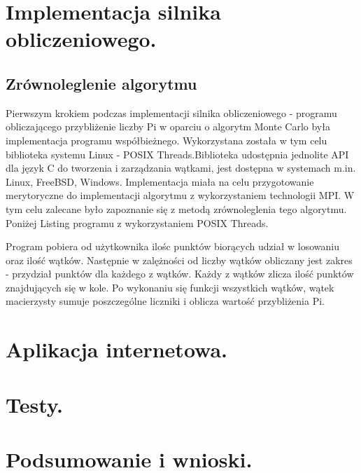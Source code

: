 \documentclass[a4paper,12pt]{article}		%
\begin{document}
\section{Implementacja silnika obliczeniowego.}

\subsection{Zrównoleglenie algorytmu}
Pierwszym krokiem podczas implementacji silnika obliczeniowego - programu obliczającego przybliżenie liczby Pi w oparciu o algorytm Monte Carlo była implementacja programu współbieżnego. Wykorzystana została w tym celu biblioteka systemu Linux - POSIX Threads.Biblioteka udostępnia jednolite API dla język C do tworzenia i zarządzania wątkami, jest dostępna w systemach m.in. Linux, FreeBSD, Windows. Implementacja miała na celu przygotowanie merytoryczne do implementacji algorytmu z wykorzystaniem technologii MPI. W tym celu zalecane było zapoznanie się z metodą zrównoleglenia tego algorytmu. Poniżej Listing programu z wykorzystaniem POSIX Threads.



Program pobiera od użytkownika ilośc punktów biorących udział w losowaniu oraz ilość wątków. Następnie w zalężności od liczby wątków obliczany jest zakres - przydział punktów dla każdego z wątków. Każdy z wątków zlicza ilość punktów znajdujących się w kole. Po wykonaniu się funkcji wszystkich wątków, wątek macierzysty sumuje poszczególne liczniki i oblicza wartość przybliżenia Pi. 

\section{Aplikacja internetowa.}

\section{Testy.}

\section{Podsumowanie i wnioski.}
\end{document}
